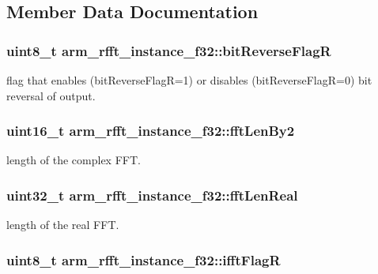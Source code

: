 \subsection{Member Data Documentation}
\hypertarget{structarm__rfft__instance__f32_ac342f3248157cbbd2f04a3c8ec9fc9eb}{
\subsubsection[{bit\-Reverse\-Flag\-R}]{\setlength{\rightskip}{0pt plus 5cm}uint8\-\_\-t arm\-\_\-rfft\-\_\-instance\-\_\-f32\-::bit\-Reverse\-Flag\-R}}\label{structarm__rfft__instance__f32_ac342f3248157cbbd2f04a3c8ec9fc9eb}
flag that enables (bit\-Reverse\-Flag\-R=1) or disables (bit\-Reverse\-Flag\-R=0) bit reversal of output. \hypertarget{structarm__rfft__instance__f32_a075076e07ebb8521d8e3b49a31db6c57}{
\subsubsection[{fft\-Len\-By2}]{\setlength{\rightskip}{0pt plus 5cm}uint16\-\_\-t arm\-\_\-rfft\-\_\-instance\-\_\-f32\-::fft\-Len\-By2}}\label{structarm__rfft__instance__f32_a075076e07ebb8521d8e3b49a31db6c57}
length of the complex F\-F\-T. \hypertarget{structarm__rfft__instance__f32_a4219d4669699e4efdcb150ed7a0d9a57}{
\subsubsection[{fft\-Len\-Real}]{\setlength{\rightskip}{0pt plus 5cm}uint32\-\_\-t arm\-\_\-rfft\-\_\-instance\-\_\-f32\-::fft\-Len\-Real}}\label{structarm__rfft__instance__f32_a4219d4669699e4efdcb150ed7a0d9a57}
length of the real F\-F\-T. \hypertarget{structarm__rfft__instance__f32_a5ee6d10a934ab4b666e0bb286c3d633f}{
\subsubsection[{ifft\-Flag\-R}]{\setlength{\rightskip}{0pt plus 5cm}uint8\-\_\-t arm\-\_\-rfft\-\_\-instance\-\_\-f32\-::ifft\-Flag\-R}}\label{structarm__rfft__instance__f32_a5ee6d10a934ab4b666e0bb286c3d633f}
